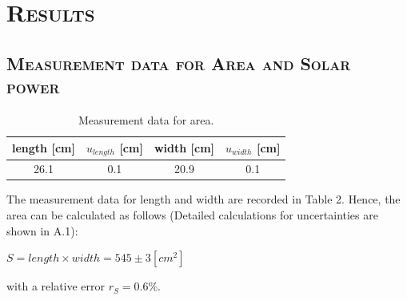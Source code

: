 \documentclass[a4paper,12pt]{article}
\begin{document}
\section{\textsc{Results}}
\subsection{\textsc{Measurement data for Area and Solar power}}
\begin{table}[H]
\begin{center}
\begin{tabular}{|c|c|c|c|}
\hline
length {[}cm{]} & $u_{length}$ {[}cm{]} & width {[}cm{]} & $u_{width}$ {[}cm{]} \\ \hline
26.1 & 0.1 & 20.9 & 0.1 \\ \hline
\end{tabular}
\caption{Measurement data for area.}
\end{center}
\end{table}

The measurement data for length and width are recorded in Table 2. Hence, the area can be calculated as follows (Detailed calculations for uncertainties are shown in A.1):
\begin{center}
$ \displaystyle S = length \times width = 545 \pm 3[cm^2] $
\end{center}
with a relative error $r_{S} = 0.6\%$.
\end{document}
